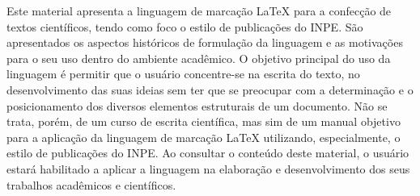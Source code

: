 
\begin{resumo}


\hypertarget{estilo:resumo}{} %


Este material apresenta a linguagem de marcação \LaTeX{} para a confecção de textos científicos, tendo como foco o estilo de publicações do INPE. São apresentados os aspectos históricos de formulação da linguagem e as motivações para o seu uso dentro do ambiente acadêmico. O objetivo principal do uso da linguagem é permitir que o usuário concentre-se na escrita do texto, no desenvolvimento das suas ideias sem ter que se preocupar com a determinação e o posicionamento dos diversos elementos estruturais de um documento. Não se trata, porém, de um curso de escrita científica, mas sim de um manual objetivo para a aplicação da linguagem de marcação \LaTeX{} utilizando, especialmente, o estilo de publicações do INPE. Ao consultar o conteúdo deste material, o usuário estará habilitado a aplicar a linguagem na elaboração e desenvolvimento dos seus trabalhos acadêmicos e científicos.

 
\end{resumo}